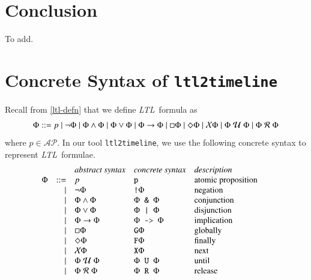 \documentclass[preprint,12pt]{elsarticle}
\theoremstyle{definition}
\theoremstyle{remark}
\newcommand{\AP}{\mathcal{AP}}
\newcommand{\always}{\Box}
\newcommand{\eventually}{\Diamond}
\newcommand{\nextt}{\mathcal{X}}
\newcommand{\limplies}{\rightarrow}
\newcommand{\ltl}{\textit{LTL}}
\newcommand{\stronguntil}{\hspace{0.1cm} \mathcal{U}  \hspace{0.1cm}}
\newcommand{\weakrelease}{\hspace{0.1cm} \mathcal{R} \hspace{0.1cm}}
\begin{document}
\section{Conclusion}
To add. %

\appendix
\section{Concrete Syntax of \texttt{ltl2timeline}} \label{sec:concrete-syntax}
Recall from \ref{ltl-defn} that we define \ltl\ formula as
\begin{align*}
    \Phi ::= p \mid \neg \Phi \mid \Phi \land \Phi \mid \Phi \lor \Phi \mid \Phi \limplies \Phi \mid \always \Phi \mid \eventually \Phi \mid \nextt \Phi \mid \Phi \stronguntil \Phi \mid \Phi \weakrelease \Phi
\end{align*}
where $p \in \AP$. In our tool \texttt{ltl2timeline}, we use the following concrete syntax to represent \ltl\ formulae.
\[
    \begin{array}{c r l l l@{\qquad} l}
         &      & \textit{abstract syntax}              & \textit{concrete syntax}                       & \textit{description} \\
    \Phi & ::=  & p                                     & \texttt{p}                                     & \text{atomic proposition} \\
         & \mid & \neg \Phi                             & \texttt{!} \Phi                                & \text{negation} \\
         & \mid & \Phi \land \Phi                       & \Phi \texttt{ \& } \Phi                        & \text{conjunction} \\
         & \mid & \Phi \lor \Phi                        & \Phi \texttt{ | } \Phi                         & \text{disjunction} \\
         & \mid & \Phi \limplies \Phi                   & \Phi \texttt{ -> } \Phi                        & \text{implication} \\
         & \mid & \always \Phi                          & \texttt{G} \Phi                                & \text{globally} \\
         & \mid & \eventually \Phi                      & \texttt{F} \Phi                                & \text{finally} \\
         & \mid & \nextt \Phi                           & \texttt{X} \Phi                                & \text{next} \\
         & \mid & \Phi \stronguntil \Phi                & \Phi \texttt{ U } \Phi                         & \text{until} \\
         & \mid & \Phi \weakrelease \Phi                & \Phi \texttt{ R } \Phi                         & \text{release} \\
    \end{array}
\]



\end{document}
